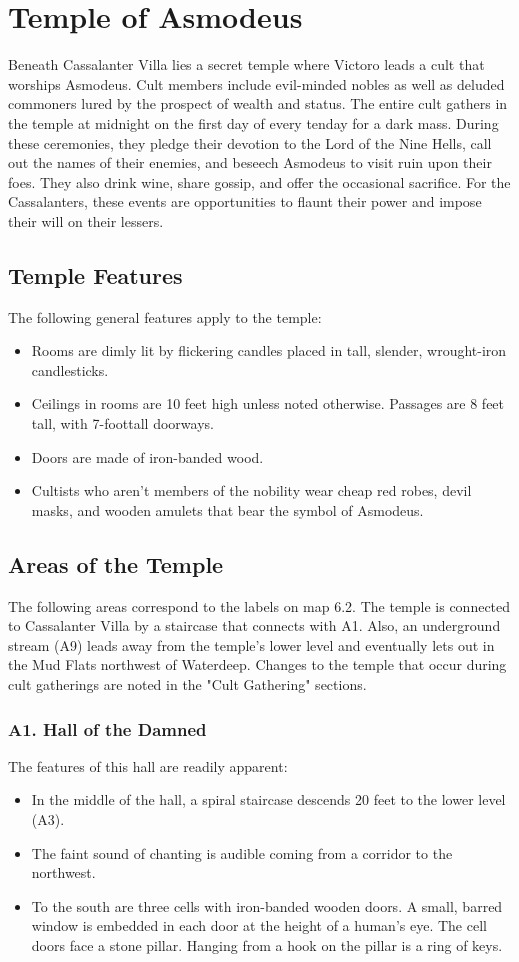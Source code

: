 \documentclass[10pt,a4paper,twoside,twocolumn,openany,nodeprecatedcode]{dndbook}
\begin{document}
\section{Temple of Asmodeus}
Beneath Cassalanter Villa lies a secret temple where Victoro leads a cult that worships Asmodeus. Cult members include evil-minded nobles as well as deluded commoners lured by the prospect of wealth and status. The entire cult gathers in the temple at midnight on the first day of every tenday for a dark mass. During these ceremonies, they pledge their devotion to the Lord of the Nine Hells, call out the names of their enemies, and beseech Asmodeus to visit ruin upon their foes. They also drink wine, share gossip, and offer the occasional sacrifice. For the Cassalanters, these events are opportunities to flaunt their power and impose their will on their lessers.
\subsection{Temple Features}
The following general features apply to the temple:
\begin{itemize}

\item Rooms are dimly lit by flickering candles placed in tall, slender, wrought-iron candlesticks.
\item Ceilings in rooms are 10 feet high unless noted otherwise. Passages are 8 feet tall, with 7-foottall doorways.
\item Doors are made of iron-banded wood.
\item Cultists who aren't members of the nobility wear cheap red robes, devil masks, and wooden amulets that bear the symbol of Asmodeus.
\end{itemize}


\subsection{Areas of the Temple}
The following areas correspond to the labels on map 6.2. The temple is connected to Cassalanter Villa by a staircase that connects with A1. Also, an underground stream (A9) leads away from the temple's lower level and eventually lets out in the Mud Flats northwest of Waterdeep.
Changes to the temple that occur during cult gatherings are noted in the "Cult Gathering" sections.
\subsubsection{A1. Hall of the Damned}
The features of this hall are readily apparent:
\begin{itemize}

\item In the middle of the hall, a spiral staircase descends 20 feet to the lower level (A3).
\item The faint sound of chanting is audible coming from a corridor to the northwest.
\item To the south are three cells with iron-banded wooden doors. A small, barred window is embedded in each door at the height of a human's eye. The cell doors face a stone pillar. Hanging from a hook on the pillar is a ring of keys.
\end{itemize}
\end{document}
